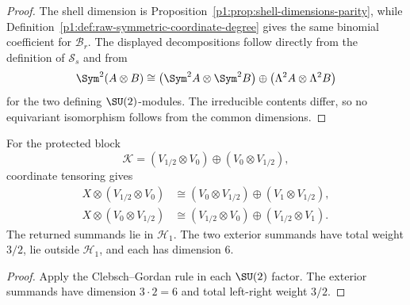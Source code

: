\documentclass[11pt]{article}
\begin{document}
\begin{proof}
The shell dimension is
Proposition~\ref{p1:prop:shell-dimensions-parity}, while
Definition~\ref{p1:def:raw-symmetric-coordinate-degree} gives the same
binomial coefficient for \(\mathcal B_r\).  The displayed decompositions
follow directly from the definition of \(\mathcal S_s\) and from
\[
\Sym^2(A\otimes B)
\cong
\bigl(\Sym^2A\otimes\Sym^2B\bigr)
\oplus
\bigl(\Lambda^2A\otimes\Lambda^2B\bigr)
\]
for the two defining \(\SU(2)\)-modules.  The irreducible contents differ, so
no equivariant isomorphism follows from the common dimensions.
\end{proof}

\begin{proposition}
\label{p1:prop:first-excluded-chiral-boundary}
For the protected block
\[
  \mathcal K=(V_{1/2}\otimes V_0)\oplus(V_0\otimes V_{1/2}),
\]
coordinate tensoring gives
\[
\begin{aligned}
X\otimes(V_{1/2}\otimes V_0)
  &\cong(V_0\otimes V_{1/2})\oplus(V_1\otimes V_{1/2}),\\
X\otimes(V_0\otimes V_{1/2})
  &\cong(V_{1/2}\otimes V_0)\oplus(V_{1/2}\otimes V_1).
\end{aligned}
\]
The returned summands lie in \(\mathcal H_1\).  The two exterior summands have
total weight \(3/2\), lie outside \(\mathcal H_1\), and each has dimension
\(6\).
\end{proposition}

\begin{proof}
Apply the Clebsch--Gordan rule in each \(\SU(2)\) factor.  The exterior
summands have dimension \(3\cdot2=6\) and total left-right weight \(3/2\).
\end{proof}
\end{document}
